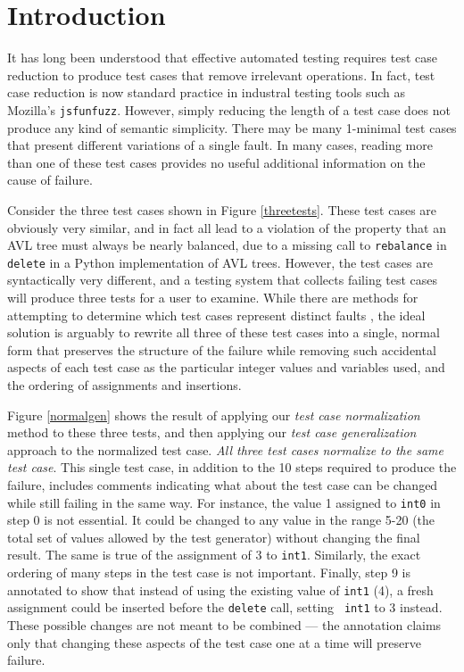 \section{Introduction}

It has long been understood that effective automated testing requires
test case reduction \cite{DD,MinUnit,ICSEDiff} to produce test cases
that remove irrelevant operations.  In fact, test case reduction is
now standard practice in industral testing tools such as Mozilla's
{\tt jsfunfuzz}.  However, simply reducing the length of a test case
does not produce any kind of semantic simplicity.  There may be many
1-minimal test cases that present different variations of a single
fault.  In many cases, reading more than one of these test cases
provides no useful additional information on the cause of failure.

Consider the three test cases shown in Figure \ref{threetests}.  These
test cases are obviously very similar, and in fact all lead to a
violation of the property that an AVL tree must always be nearly
balanced, due to a missing call to {\tt rebalance} in {\tt delete} in
a Python implementation of AVL trees.  However, the test cases are
syntactically very different, and a testing system that collects
failing test cases will produce three tests for a user to examine.
While there are methods for attempting to determine which test cases
represent distinct faults \cite{PLDI13}, the ideal solution is
arguably to rewrite all three of these test cases into a single,
normal form that preserves the structure of the failure while removing
such accidental aspects of each test case as the particular integer
values and variables used, and the ordering of assignments and
insertions.

Figure \ref{normalgen} shows the result of applying our \emph{test case
  normalization} method to these three tests, and then applying our
\emph{test case generalization} approach to the normalized test case.
\emph{All three test cases normalize to the same test
case}.  This single test case, in addition to the 10 steps required to produce
the failure, includes comments indicating what about the test case can
be changed while still failing in the same way.  For instance, the
value 1 assigned to {\tt int0} in step 0 is not essential.  It could
be changed to any value in the range 5-20 (the total set of values
allowed by the test generator) without changing the final result.  The
same is true of the assignment of 3 to {\tt int1}.  Similarly, the
exact ordering of many steps in the test case is not important.  Finally,
step 9 is annotated to show that instead of using the existing value
of {\tt int1} (4), a fresh assignment could be inserted before the
{\tt delete} call, setting {\tt
  int1} to 3 instead.  These possible
changes are not meant to be combined --- the annotation claims only
that changing these aspects of the test case one at a time will
preserve failure.

